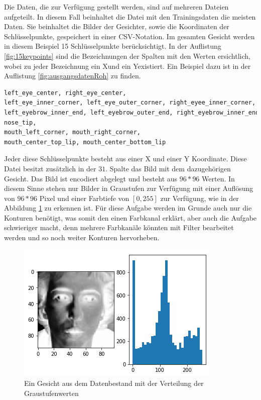 Die Daten, die zur Verfügung gestellt werden, sind auf mehreren Dateien aufgeteilt. 
In diesem Fall beinhaltet die Datei mit den Trainingsdaten die meisten Daten. 
Sie beinhaltet die Bilder der Gesichter, sowie die Koordinaten der Schlüsselpunkte, gespeichert in einer CSV-Notation.
Im gesamten Gesicht werden in diesem Beispiel 15 Schlüsselpunkte berücksichtigt. 
In der Auflistung \ref{fig:15keypoints} sind die Bezeichnungen der Spalten mit den Werten ersichtlich, wobei zu jeder Bezeichnung ein \glqq X\grqq und ein \glqq Y\grqq existiert.
Ein Beispiel dazu ist in der Auflistung \ref{fig:ausgangsdatenRoh} zu finden.
\begin{lstlisting}[caption={$15$ Schlüsselpunkte im Gesicht eines Menschen},label=fig:15keypoints,captionpos=b,language=Python]
left_eye_center, right_eye_center, 
left_eye_inner_corner, left_eye_outer_corner, right_eyee_inner_corner, right_eye_outer_corner, 
left_eyebrow_inner_end, left_eyebrow_outer_end, right_eyebrow_inner_end, right_eyebrow_outer_end, 
nose_tip, 
mouth_left_corner, mouth_right_corner, 
mouth_center_top_lip, mouth_center_bottom_lip
\end{lstlisting}
Jeder diese Schlüsselpunkte besteht aus einer X und einer Y Koordinate. 
Diese Datei besitzt zusätzlich in der $31.$ Spalte das Bild mit dem dazugehörigen Gesicht.
Das Bild ist encodiert abgelegt und besteht aus $96 * 96$ Werten. 
In diesem Sinne stehen nur Bilder in Graustufen zur Verfügung mit einer Auflösung von $96 * 96$ Pixel und einer Farbtiefe von $[0, 255]$ zur Verfügung, wie in der Abbildung \ref{fig:ausgangsdaten} zu erkennen ist. 
Für diese Aufgabe werden im Grunde auch nur die Konturen benötigt, was somit den einen Farbkanal erklärt, aber auch die Aufgabe schwieriger macht, denn mehrere Farbkanäle könnten mit Filter bearbeitet werden und so noch weiter Konturen hervorheben. 
\begin{figure}
	\centering
	\includegraphics[scale=0.75]{images/ausgangsDaten.png}
	\caption{Ein Gesicht aus dem Datenbestand mit der Verteilung der Graustufenwerten}
	\label{fig:ausgangsdaten}
\end{figure}
